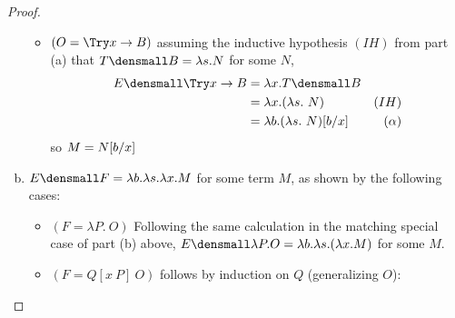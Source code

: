 \begin{proof}
\begin{enumerate}[(a)]
\begin{itemize}
      \item $(O = \Try x \to B)$
        assuming the inductive hypothesis $(IH)$ from part (a) that
        $T\den{B} = \lambda s. N$ for some $N$,
        \begin{align*}
          E\den{\Try x \to B}
          &= \lambda x. T\den{B}
          \\
          &= \lambda x. (\lambda s.~ N)
          & (IH)
          \\
          &=\lambda b. (\lambda s.~ N)\subst{x}{b}
          & (\alpha)
        \end{align*}
        so $M = N\subst{x}{b}$
    \end{itemize}
  \item $E\den{F} = \lambda b. \lambda s. \lambda x. M$ for some term $M$, as shown by the following cases:
    \begin{itemize}
    \item $(F= \lambda P. ~O)$
      Following the same calculation in the matching special case of part (b) above,
      $E\den{\lambda P. O} = \lambda b. \lambda s. (\lambda x. M)$
      for some $M$.
    \item $(F= Q[x ~P] ~O)$
      follows by induction on $Q$ (generalizing $O$):

\end{itemize}
\end{enumerate}
\end{proof}
